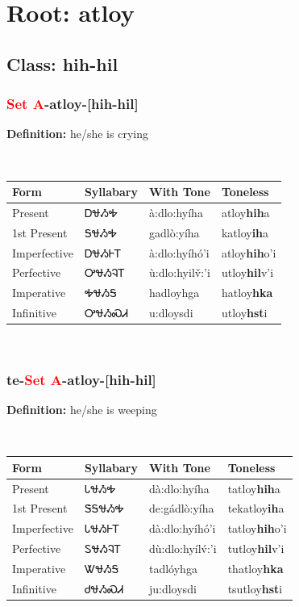 \needspace{4in}
\section*{Root: atloy}
\nopagebreak
{}
\needspace{3in}
\subsection*{Class: hih-hil}
\nopagebreak
\needspace{2in}
\subsubsection*{\textcolor{Red}{Set A}{-}\textbf{atloy}{-}[hih-hil]}
\nopagebreak
\textbf{Definition: } he/she is crying
\\[0.5em]
\begin{tabularx}{\textwidth}{l X X X}%
\toprule%
\textbf{Form}&\textbf{Syllabary}&\textbf{With Tone}&\textbf{Toneless}\\%
\midrule%
Present&ᎠᏠᏱᎭ&à:dlo:hyíha&atloy\textbf{hih}a\\%
1st Present&ᎦᏠᏱᎭ&gadlò:yíha&katloy\textbf{ih}a\\%
Imperfective&ᎠᏠᏱᎰᎢ&à:dlo:hyíhó’i&atloy\textbf{hih}o'i\\%
Perfective&ᎤᏠᏱᎸᎢ&ù:dlo:hyilv̌:’i&utloy\textbf{hil}v'i\\%
Imperative&ᎭᏠᏱᎦ&hadloyhga&hatloy\textbf{hka}\\%
Infinitive&ᎤᏠᏱᏍᏗ&u:dloysdi&utloy\textbf{hst}i\\%
\bottomrule%
\end{tabularx}
\\[1em]
\needspace{2in}
\subsubsection*{te{-}\textcolor{Red}{Set A}{-}\textbf{atloy}{-}[hih-hil]}
\nopagebreak
\textbf{Definition: } he/she is weeping
\\[0.5em]
\begin{tabularx}{\textwidth}{l X X X}%
\toprule%
\textbf{Form}&\textbf{Syllabary}&\textbf{With Tone}&\textbf{Toneless}\\%
\midrule%
Present&ᏓᏠᏱᎭ&dà:dlo:hyíha&tatloy\textbf{hih}a\\%
1st Present&ᏕᎦᏠᏱᎭ&de:gádlò:yíha&tekatloy\textbf{ih}a\\%
Imperfective&ᏓᏠᏱᎰᎢ&dà:dlo:hyíhó’i&tatloy\textbf{hih}o'i\\%
Perfective&ᏚᏠᏱᎸᎢ&dù:dlo:hyílv́:’i&tutloy\textbf{hil}v'i\\%
Imperative&ᏔᏠᏱᎦ&tadlóyhga&thatloy\textbf{hka}\\%
Infinitive&ᏧᏠᏱᏍᏗ&ju:dloysdi&tsutloy\textbf{hst}i\\%
\bottomrule%
\end{tabularx}
\\[1em]
